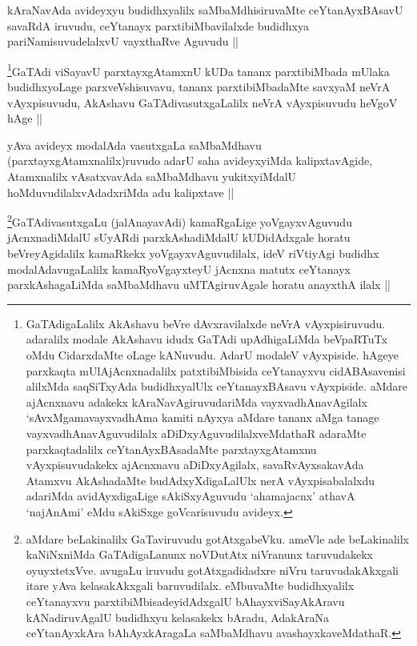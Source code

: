 \begin{artha}
kAraNavAda avideyxyu budidhxyalilx saMbaMdhisiruvaMte ceYtanAyxBAsavU savaRdA iruvudu, ceYtanayx parxtibiMbavilalxde budidhxya pariNamisuvudelalxvU vayxthaRve Aguvudu ||
\end{artha}

\begin{artha}
\footnote[1]{GaTAdigaLalilx AkAshavu beVre dAvxravilalxde neVrA vAyxpisiruvudu. adaralilx modale AkAshavu idudx GaTAdi upAdhigaLiMda beVpaRTuTx oMdu CidarxdaMte oLage kANuvudu. AdarU modaleV vAyxpiside. hAgeye parxkaqta mUlAjAcnxnadalilx patxtibiMbisida ceYtanayxvu cidABAsavenisi alilxMda saqSiTxyAda budidhxyalUlx ceYtanayxBAsavu vAyxpiside. aMdare ajAcnxnavu adakekx kAraNavAgiruvudariMda vayxvadhAnavAgilalx `sAvxMgamavayxvadhAma kamiti nAyxya aMdare tananx aMga tanage vayxvadhAnavAguvudilalx aDiDxyAguvudilalxveMdathaR adaraMte parxkaqtadalilx ceYtanAyxBAsadaMte parxtayxgAtamxnu vAyxpisuvudakekx ajAcnxnavu aDiDxyAgilalx, savaRvAyxsakavAda Atamxvu AkAshadaMte budAdxyXdigaLalUlx nerA vAyxpisabalalxdu adariMda avidAyxdigaLige sAkiSxyAguvudu `ahamajacnx' athavA `najAnAmi' eMdu sAkiSxge goVcarisuvudu avideyx.}GaTAdi viSayavU parxtayxgAtamxnU kUDa tananx parxtibiMbada mUlaka budidhxyoLage parxveVshisuvavu, tananx parxtibiMbadaMte savxyaM neVrA vAyxpisuvudu, AkAshavu GaTAdivasutxgaLalilx neVrA vAyxpisuvudu heVgoV hAge ||
\end{artha}

\begin{artha}
yAva avideyx modalAda vasutxgaLa saMbaMdhavu (parxtayxgAtamxnalilx)ruvudo adarU saha avideyxyiMda kalipxtavAgide, Atamxnalilx vAsatxvavAda saMbaMdhavu yukitxyiMdalU hoMduvudilalxvAdadxriMda adu kalipxtave ||
\end{artha}

\begin{artha}
\footnote[1]{aMdare beLakinalilx GaTaviruvudu gotAtxgabeVku. ameVle ade beLakinalilx kaNiNxniMda GaTAdigaLanunx noVDutAtx niVranunx taruvudakekx oyuyxtetxVve. avugaLu iruvudu gotAtxgadidadxre niVru taruvudakAkxgali itare yAva kelasakAkxgali baruvudilalx. eMbuvaMte budidhxyalilx ceYtanayxvu parxtibiMbisadeyidAdxgalU bAhayxviSayAkAravu kANadiruvAgalU budidhxyu kelasakekx bAradu, AdakAraNa ceYtanAyxkAra bAhAyxkAragaLa saMbaMdhavu avashayxkaveMdathaR.}GaTAdivasutxgaLu (jalAnayavAdi) kamaRgaLige yoVgayxvAguvudu jAcnxnadiMdalU sUyARdi parxkAshadiMdalU kUDidAdxgale horatu beVreyAgidalilx kamaRkekx yoVgayxvAguvudilalx, ideV riVtiyAgi budidhx modalAdavugaLalilx kamaRyoVgayxteyU jAcnxna matutx ceYtanayx parxkAshagaLiMda saMbaMdhavu uMTAgiruvAgale horatu anayxthA ilalx ||
\end{artha}


